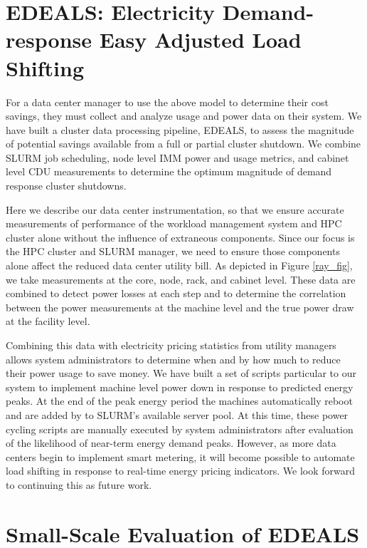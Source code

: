 \section{EDEALS: Electricity Demand-response Easy Adjusted Load Shifting}

For a data center manager to use the above model to determine their cost savings, they must collect and analyze usage and power data on their system.  We have built a cluster data processing pipeline, EDEALS, to assess the magnitude of potential savings available from a full or partial cluster shutdown.  We combine SLURM job scheduling, node level IMM power and usage metrics, and cabinet level CDU measurements to determine the optimum magnitude of demand response cluster shutdowns.  

Here we describe our data center instrumentation, so that we ensure accurate measurements of performance of the workload management system and HPC cluster alone without the influence of extraneous components. Since our focus is the HPC cluster and SLURM manager, we need to ensure those components alone affect the reduced data center utility bill.  As depicted in Figure \ref{ray_fig}, we take measurements at the core, node, rack, and cabinet level.  These data are combined to detect power losses at each step and to determine the correlation between the power measurements at the machine level and the true power draw at the facility level.

Combining this data with electricity pricing statistics from utility managers allows system administrators to determine when and by how much to reduce their power usage to save money.  We have built a set of scripts particular to our system to implement machine level power down in response to predicted energy peaks.  At the end of the peak energy period the machines automatically reboot and are added by to SLURM’s available server pool.  At this time, these power cycling scripts are manually executed by system administrators after evaluation of the likelihood of near-term energy demand peaks.  However, as more data centers begin to implement smart metering, it will become possible to automate load shifting in response to real-time energy pricing indicators.  We look forward to continuing this as future work.





\section{Small-Scale Evaluation of EDEALS}

